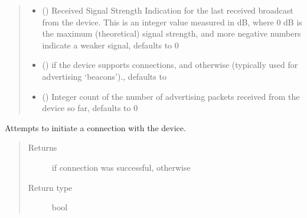\documentclass[letterpaper,10pt,english]{sphinxmanual}
\begin{document}
\begin{fulllineitems}
\begin{quote}
\begin{description}
\begin{itemize}
\item {} 
 (\sphinxstyleliteralemphasis{\sphinxupquote{, }}) \textendash{} Received Signal Strength Indication for the last received broadcast from the device. This is an integer value measured in dB, where 0 dB is the maximum (theoretical) signal strength, and more negative numbers indicate a weaker signal, defaults to 0

\item {} 
 (\sphinxstyleliteralemphasis{\sphinxupquote{, }}) \textendash{}  if the device supports connections, and  otherwise (typically used for advertising ‘beacons’)., defaults to 

\item {} 
 (\sphinxstyleliteralemphasis{\sphinxupquote{, }}) \textendash{} Integer count of the number of advertising packets received from the device so far, defaults to 0

\end{itemize}

\end{description}\end{quote}

\begin{fulllineitems}
\label{\detokenize{simpleble:simpleble.SimpleBleDevice.connect}}
Attempts to initiate a connection with the device.
\begin{quote}\begin{description}
\item[{Returns}] \leavevmode
{} if connection was successful,  otherwise

\item[{Return type}] \leavevmode
bool

\end{description}\end{quote}

\end{fulllineitems}


\end{fulllineitems}
\end{document}
